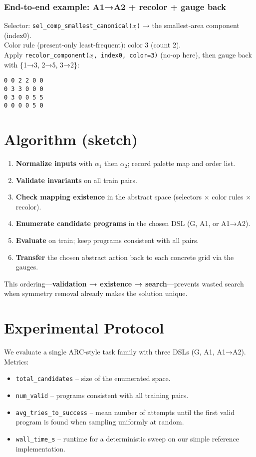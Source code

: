 \documentclass[11pt]{article}
\newcommand{\code}[1]{\texttt{#1}}
\begin{document}
\subsubsection{End-to-end example: A1→A2 + recolor + gauge back}

Selector: \code{sel\_comp\_smallest\_canonical($x_{\hat{}}$)} → the smallest-area component (index0).\\
Color rule (present-only least-frequent): color 3 (count 2).\\
Apply \code{recolor\_component($x_{\hat{}}$, index0, color=3)} (no-op here), then gauge back with \{1→3, 2→5, 3→2\}:
\begin{lstlisting}
0 0 2 2 0 0
0 3 3 0 0 0
0 3 0 0 5 5
0 0 0 0 5 0
\end{lstlisting}

\section{Algorithm (sketch)}

\begin{enumerate}
\item \textbf{Normalize inputs} with $\alpha_1$ then $\alpha_2$; record palette map and order list.
\item \textbf{Validate invariants} on all train pairs.
\item \textbf{Check mapping existence} in the abstract space (selectors $\times$ color rules $\times$ recolor).
\item \textbf{Enumerate candidate programs} in the chosen DSL (G, A1, or A1→A2).
\item \textbf{Evaluate} on train; keep programs consistent with all pairs.
\item \textbf{Transfer} the chosen abstract action back to each concrete grid via the gauges.
\end{enumerate}

This ordering---\textbf{validation → existence → search}---prevents wasted search when symmetry removal already makes the solution unique.

\section{Experimental Protocol}

We evaluate a single ARC-style task family with three DSLs (G, A1, A1→A2). Metrics:
\begin{itemize}
\item \code{total\_candidates} -- size of the enumerated space.
\item \code{num\_valid} -- programs consistent with all training pairs.
\item \code{avg\_tries\_to\_success} -- mean number of attempts until the first valid program is found when sampling uniformly at random.
\item \code{wall\_time\_s} -- runtime for a deterministic sweep on our simple reference implementation.
\end{itemize}
\end{document}
